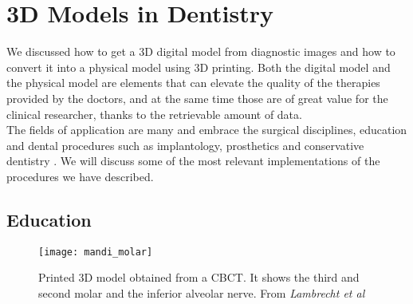 
\chapter{3D Models in Dentistry} %

\label{Chapter6} %


We discussed how to get a 3D digital model from diagnostic images and how to convert it into a physical model using 3D printing. Both the digital model and the physical model are elements that can elevate the quality of the therapies provided by the doctors, and at the same time those are of great value for the clinical researcher, thanks to the retrievable amount of data.\\
The fields of application are many and embrace the surgical disciplines, education and dental procedures such as implantology, prosthetics and conservative dentistry \parencite{Reference103}.
We will discuss some of the most relevant implementations of the procedures we have described.

\section{Education}
\begin{wrapfigure} {R} {0.4\textwidth}
\vspace{-20pt}
	\begin{center}
	\texttt{[image: mandi\_molar]}
    \caption{Printed 3D model obtained from a CBCT. It shows the third and second molar and the inferior alveolar nerve. From \emph{Lambrecht et al} \parencite{Reference69}}
    \label{fig:mandi_molar}
    \end{center}
\vspace{-20pt}
\end{wrapfigure}

